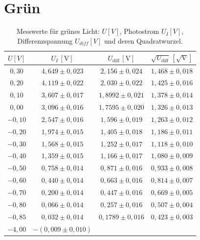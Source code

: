 \newpage

\section{Grün}
\begin{table}[h!]
    \centering
    \begin{tabular}{cccc}
    \hline
    $U [V]$ & $U_I \, [\mathrm{V}]$ & $U_{\text{diff}} \, [\mathrm{V}]$ & $\sqrt{U_{\text{diff}}} \, [\mathrm{\sqrt{V}}]$ \\
    \hline
    $0,30$ & $4,649 \pm 0,023$ & $2,156 \pm 0,024$ & $1,468 \pm 0,018$ \\
    $0,20$ & $4,119 \pm 0,022$ & $2,030 \pm 0,022$ & $1,425 \pm 0,016$ \\
    $0,10$ & $3,607 \pm 0,017$ & $1,8992 \pm 0,021$ & $1,378 \pm 0,014$ \\
    $0,00$ & $3,096 \pm 0,016$ & $1,7595 \pm 0,020$ & $1,326 \pm 0,013$ \\
    $-0,10$ & $2,547 \pm 0,016$ & $1,596 \pm 0,019$ & $1,263 \pm 0,012$ \\
    $-0,20$ & $1,974 \pm 0,015$ & $1,405 \pm 0,018$ & $1,186 \pm 0,011$ \\
    $-0,30$ & $1,568 \pm 0,015$ & $1,252 \pm 0,017$ & $1,118 \pm 0,010$ \\
    $-0,40$ & $1,359 \pm 0,015$ & $1,166 \pm 0,017$ & $1,080 \pm 0,009$ \\
    $-0,50$ & $0,758 \pm 0,014$ & $0,871 \pm 0,016$ & $0,933 \pm 0,008$ \\
    $-0,60$ & $0,440 \pm 0,014$ & $0,663 \pm 0,016$ & $0,814 \pm 0,007$ \\
    $-0,70$ & $0,200 \pm 0,014$ & $0,447 \pm 0,016$ & $0,669 \pm 0,005$ \\
    $-0,80$ & $0,066 \pm 0,014$ & $0,257 \pm 0,016$ & $0,507 \pm 0,004$ \\
    $-0,85$ & $0,032 \pm 0,014$ & $0,1789 \pm 0,016$ & $0,423 \pm 0,003$ \\
    $-4,00$ & $-(0,009 \pm 0,010)$ & & \\
    \hline
    \end{tabular}
    \caption{Messwerte für grünes Licht: $U [V]$, Photostrom $U_I [V]$, Differenzspannung $U_{diff} [V]$ und deren Quadratwurzel.}
    \label{tab:gruen_values}
\end{table}


\newpage

